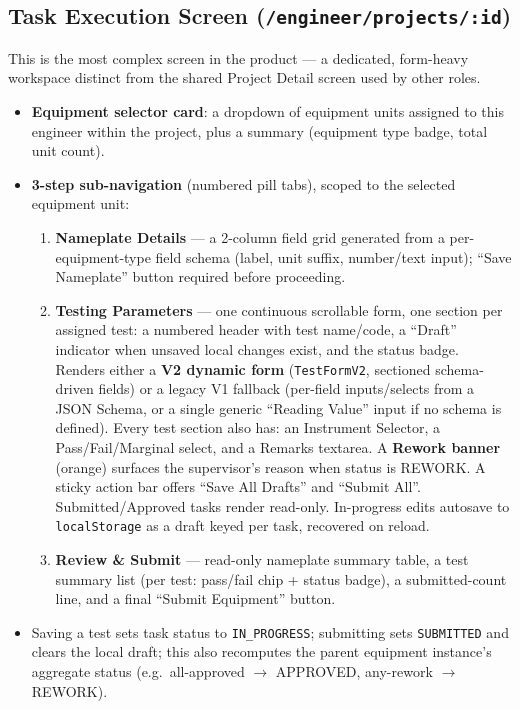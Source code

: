 \documentclass[11pt]{article}
\begin{document}
\subsection{Task Execution Screen (\texttt{/engineer/projects/:id})}
This is the most complex screen in the product --- a dedicated, form-heavy workspace distinct from
the shared Project Detail screen used by other roles.
\begin{itemize}[nosep]
  \item \textbf{Equipment selector card}: a dropdown of equipment units assigned to this engineer
    within the project, plus a summary (equipment type badge, total unit count).
  \item \textbf{3-step sub-navigation} (numbered pill tabs), scoped to the selected equipment unit:
  \begin{enumerate}[nosep]
    \item \textbf{Nameplate Details} --- a 2-column field grid generated from a per-equipment-type
      field schema (label, unit suffix, number/text input); ``Save Nameplate'' button required
      before proceeding.
    \item \textbf{Testing Parameters} --- one continuous scrollable form, one section per assigned
      test: a numbered header with test name/code, a ``Draft'' indicator when unsaved local
      changes exist, and the status badge. Renders either a \textbf{V2 dynamic form}
      (\texttt{TestFormV2}, sectioned schema-driven fields) or a legacy V1 fallback (per-field
      inputs/selects from a JSON Schema, or a single generic ``Reading Value'' input if no schema
      is defined). Every test section also has: an Instrument Selector, a Pass/Fail/Marginal
      select, and a Remarks textarea. A \textbf{Rework banner} (orange) surfaces the supervisor's
      reason when status is REWORK. A sticky action bar offers ``Save All Drafts'' and
      ``Submit All''. Submitted/Approved tasks render read-only. In-progress edits autosave to
      \texttt{localStorage} as a draft keyed per task, recovered on reload.
    \item \textbf{Review \& Submit} --- read-only nameplate summary table, a test summary list
      (per test: pass/fail chip + status badge), a submitted-count line, and a final ``Submit
      Equipment'' button.
  \end{enumerate}
  \item Saving a test sets task status to \texttt{IN\_PROGRESS}; submitting sets
    \texttt{SUBMITTED} and clears the local draft; this also recomputes the parent equipment
    instance's aggregate status (e.g.\ all-approved $\to$ APPROVED, any-rework $\to$ REWORK).
\end{itemize}
\end{document}
